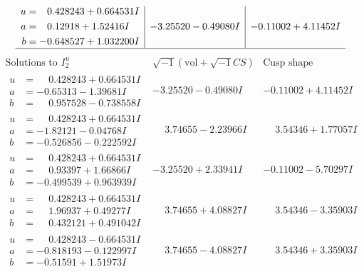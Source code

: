\documentclass[1p]{elsarticle_modified}
\theoremstyle{definition}
\newcommand{\I}{\sqrt{-1}}
\begin{document}
$$\begin{array}{c|c|c}
\begin{aligned}
u &= \phantom{-}0.428243 + 0.664531 I \\
a &= \phantom{-}0.12918 + 1.52416 I \\
b &= -0.648527 + 1.032200 I\end{aligned}
 & -3.25520 - 0.49080 I & -0.11002 + 4.11452 I\\
 \hline 
 \end{array}$$\newpage$$\begin{array}{c|c|c}  
\text{Solutions to }I^u_{2}& \I (\text{vol} + \sqrt{-1}CS) & \text{Cusp shape}\\
 \hline 
\begin{aligned}
u &= \phantom{-}0.428243 + 0.664531 I \\
a &= -0.65313 - 1.39681 I \\
b &= \phantom{-}0.957528 - 0.738558 I\end{aligned}
 & -3.25520 - 0.49080 I & -0.11002 + 4.11452 I \\ \hline\begin{aligned}
u &= \phantom{-}0.428243 + 0.664531 I \\
a &= -1.82121 - 0.04768 I \\
b &= -0.526856 - 0.222592 I\end{aligned}
 & \phantom{-}3.74655 - 2.23966 I & \phantom{-}3.54346 + 1.77057 I \\ \hline\begin{aligned}
u &= \phantom{-}0.428243 + 0.664531 I \\
a &= \phantom{-}0.93397 + 1.66866 I \\
b &= -0.499539 + 0.963939 I\end{aligned}
 & -3.25520 + 2.33941 I & -0.11002 - 5.70297 I \\ \hline\begin{aligned}
u &= \phantom{-}0.428243 + 0.664531 I \\
a &= \phantom{-}1.96937 + 0.49277 I \\
b &= \phantom{-}0.432121 + 0.491042 I\end{aligned}
 & \phantom{-}3.74655 + 4.08827 I & \phantom{-}3.54346 - 3.35903 I \\ \hline\begin{aligned}
u &= \phantom{-}0.428243 - 0.664531 I \\
a &= -0.818193 - 0.122997 I \\
b &= -0.51591 + 1.51973 I\end{aligned}
 & \phantom{-}3.74655 - 4.08827 I & \phantom{-}3.54346 + 3.35903 I \\ \hline\begin{aligned}

\end{aligned}
\end{array}$$
\end{document}
